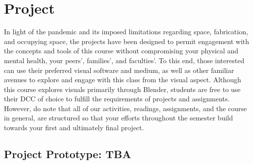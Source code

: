 \section{Project}

In light of the pandemic and its imposed limitations regarding space, fabrication, and occupying space, the projects have been designed to permit engagement with the concepts and tools of this course without compromising your physical and mental health, your peers', families', and faculties'. To this end, those interested can use their preferred visual software and medium, as well as other familiar avenues to explore and engage with this class from the visual aspect. Although this course explores visuals primarily through Blender, students are free to use their DCC of choice to fulfill the requirements of projects and assignments. However, do note that all of our activities, readings, assignments, and the course in general, are structured so that your efforts throughout the semester build towards your first and ultimately final project.

\hypertarget{project1}{\subsection{Project Prototype: TBA}}


